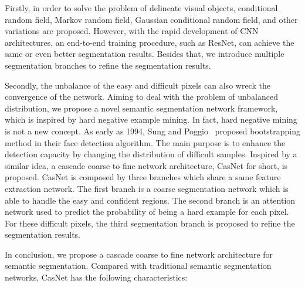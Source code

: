 \documentclass[10.5pt,compsoc]{TsT}
\newcommand{\upcite}[1]{\superscript{\textsuperscript{\cite{#1}}}}
\theoremstyle{mystyle}
\newcommand{\upcite}[1]{\textsuperscript{\cite{#1}}}
\begin{document}
{Firstly, in order to solve the problem of delineate visual objects, conditional random field, Markov random field, Gaussian conditional random field, and other variations are proposed. However, with the rapid development of CNN architectures, an end-to-end training procedure, such as ResNet\upcite{1}, can achieve the same or even better segmentation results. Besides that, we introduce multiple segmentation branches to refine the segmentation results.

Secondly, the unbalance of the easy and difficult pixels can also wreck the convergence of the network. Aiming to deal with the problem of unbalanced distribution, we propose a novel semantic segmentation network framework, which is inspired by hard negative example mining. In fact, hard negative mining is not a new concept. As early as 1994, Sung and Poggio~\upcite{5} proposed bootstrapping method in their face detection algorithm. The main purpose is to enhance the detection capacity by changing the distribution of difficult samples. Inspired by a similar idea, a cascade coarse to fine network architecture, CasNet for short, is proposed. CasNet is composed by three branches which share a same feature extraction network. The first branch is a coarse segmentation network which is able to handle the easy and confident regions. The second branch is an attention network used to predict the probability of being a hard example for each pixel. For these difficult pixels, the third segmentation branch is proposed to refine the segmentation results. 

In conclusion, we propose a cascade coarse to fine network architecture for semantic segmentation. Compared with  traditional semantic segmentation networks, CasNet has the following characteristics: 


}
\end{document}
